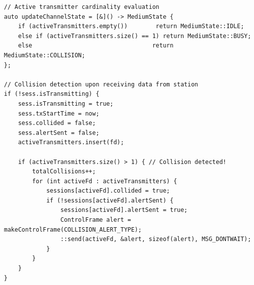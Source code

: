 \documentclass[11pt,a4paper]{article}
\begin{document}
\begin{lstlisting}[caption={Shared Channel Emulator: Collision Detection \& State Multiplexing (src/channel\_emulator.cpp)}]
// Active transmitter cardinality evaluation
auto updateChannelState = [&]() -> MediumState {
    if (activeTransmitters.empty())        return MediumState::IDLE;
    else if (activeTransmitters.size() == 1) return MediumState::BUSY;
    else                                  return MediumState::COLLISION;
};

// Collision detection upon receiving data from station
if (!sess.isTransmitting) {
    sess.isTransmitting = true;
    sess.txStartTime = now;
    sess.collided = false;
    sess.alertSent = false;
    activeTransmitters.insert(fd);

    if (activeTransmitters.size() > 1) { // Collision detected!
        totalCollisions++;
        for (int activeFd : activeTransmitters) {
            sessions[activeFd].collided = true;
            if (!sessions[activeFd].alertSent) {
                sessions[activeFd].alertSent = true;
                ControlFrame alert = makeControlFrame(COLLISION_ALERT_TYPE);
                ::send(activeFd, &alert, sizeof(alert), MSG_DONTWAIT);
            }
        }
    }
}
\end{lstlisting}
\end{document}
